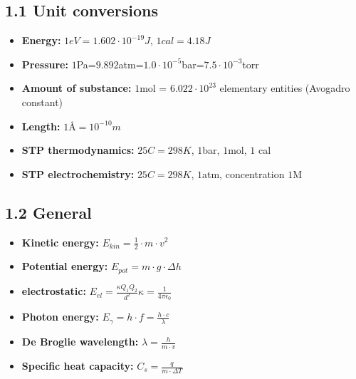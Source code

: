 \subsection{1.1 Unit conversions}
	\begin{itemize}
		\itemsep0em
  		\item \textbf{Energy:} $1eV=1.602\cdot 10^{-19}J$,    $1cal=4.18J$
    	\item \textbf{Pressure:} $1$Pa=$9.892$atm=$1.0\cdot 10^{-5}$bar=$7.5\cdot 10^{-3}$torr
    	\item \textbf{Amount of substance:} $1$mol = $6.022\cdot 10^{23}$ elementary entities (Avogadro constant)
    	\item \textbf{Length:} $1\text{Å}=10^{-10}m$
    	\item \textbf{STP thermodynamics: } $25C=298K$,  $1$bar,  $1$mol, $1$ cal
    	\item \textbf{STP electrochemistry: } $25C=298K$,  $1$atm, concentration $1$M
	\end{itemize}

\subsection{1.2 General}
    \begin{itemize}
		\itemsep0em
        \item \textbf{Kinetic energy:} $E_{kin} = \frac{1}{2} \cdot m \cdot v^2$
        \item \textbf{Potential energy:} $E_{pot} = m \cdot g \cdot \Delta h$
        \item \textbf{electrostatic:} $E_{el}=\frac{\kappa Q_1Q_2}{d^2}$\quad $\kappa = \frac{1}{4\pi \epsilon_0}$
        \item \textbf{Photon energy: } $E_\gamma = h\cdot f = \frac{h\cdot c}{\lambda}$
        \item \textbf{De Broglie wavelength: } $\lambda = \frac{h}{m\cdot v}$
        \item \textbf{Specific heat capacity: }$C_s=\frac{q}{m\cdot\Delta T}$
    \end{itemize}
    	
